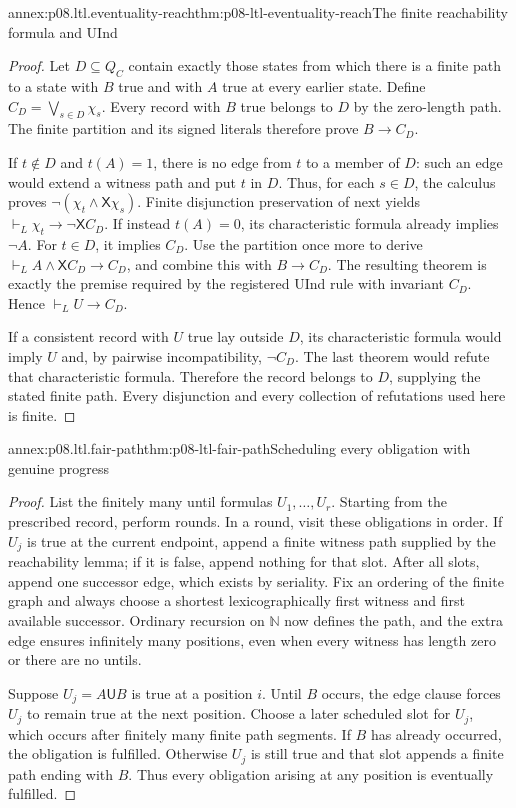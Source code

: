 \begin{annexitem}{annex:p08.ltl.eventuality-reach}{thm:p08-ltl-eventuality-reach}{The finite reachability formula and UInd}
\begin{proof}
Let \(D\subseteq Q_C\) contain exactly those states from which
there is a finite path to a state with \(B\) true and with \(A\)
true at every earlier state. Define
\(C_D=\bigvee_{s\in D}\chi_s\).
Every record with \(B\) true belongs to \(D\) by the zero-length
path. The finite partition and its signed literals therefore prove
\(B\to C_D\).

If \(t\notin D\) and \(t(A)=1\), there is no edge from
\(t\) to a member of \(D\): such an edge would extend a
witness path and put \(t\) in \(D\). Thus, for each \(s\in D\),
the calculus proves \(\neg(\chi_t\land\mathsf X\chi_s)\).
Finite disjunction preservation of next yields
\(\vdash_L\chi_t\to\neg\mathsf XC_D\).
If instead \(t(A)=0\), its characteristic formula already
implies \(\neg A\). For \(t\in D\), it implies \(C_D\).
Use the partition once more to derive
\(\vdash_L A\land\mathsf XC_D\to C_D\), and combine this
with \(B\to C_D\). The resulting theorem is exactly the
premise required by the registered UInd rule with invariant
\(C_D\). Hence \(\vdash_L U\to C_D\).

If a consistent record with \(U\) true lay outside \(D\),
its characteristic formula would imply \(U\) and, by pairwise
incompatibility, \(\neg C_D\). The last theorem would refute
that characteristic formula. Therefore the record belongs to
\(D\), supplying the stated finite path. Every disjunction and
every collection of refutations used here is finite.
\end{proof}
\end{annexitem}

\begin{annexitem}{annex:p08.ltl.fair-path}{thm:p08-ltl-fair-path}{Scheduling every obligation with genuine progress}
\begin{proof}
List the finitely many until formulas \(U_1,\ldots,U_r\).
Starting from the prescribed record, perform rounds. In a round,
visit these obligations in order. If \(U_j\) is true at the
current endpoint, append a finite witness path supplied by the
reachability lemma; if it is false, append nothing for that slot.
After all slots, append one successor edge, which exists by
seriality. Fix an ordering of the finite graph and always choose
a shortest lexicographically first witness and first available
successor. Ordinary recursion on \(\mathbb N\) now defines
the path, and the extra edge ensures infinitely many positions,
even when every witness has length zero or there are no untils.

Suppose \(U_j=A\mathbin{\mathsf U}B\) is true at a position
\(i\). Until \(B\) occurs, the edge clause forces \(U_j\)
to remain true at the next position. Choose a later scheduled
slot for \(U_j\), which occurs after finitely many finite path
segments. If \(B\) has already occurred, the obligation is
fulfilled. Otherwise \(U_j\) is still true and that slot
appends a finite path ending with \(B\). Thus every obligation
arising at any position is eventually fulfilled.
\end{proof}
\end{annexitem}

